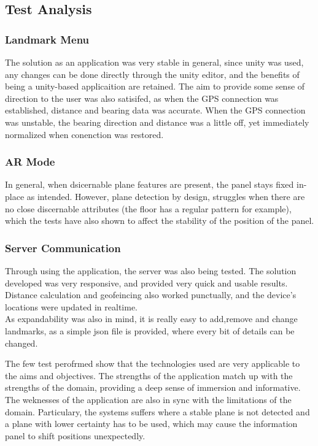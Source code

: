 \subsection{Test Analysis}
\subsubsection{Landmark Menu}
The solution as an application was very stable in general, since unity was used, any changes can be done directly through the unity editor, and the benefits of being a 
unity-based applicaition are retained. The aim to provide some sense of direction to the user was also satisifed, as when the GPS connection was established, distance 
and bearing data was accurate. When the GPS connection was unstable, the bearing direction and distance was a little off, yet immediately normalized when conenction was restored. 
\subsubsection{AR Mode}
In general, when dsicernable plane features are present, the panel stays fixed in-place as intended.
However, plane detection by design, struggles when there are no close discernable attributes (the floor has a regular pattern for example), which the tests 
have also shown to affect the stability of the position of the panel.
\subsubsection{Server Communication}
Through using the application, the server was also being tested. The solution developed was very responsive, and provided very quick and usable results. 
Distance calculation and geofeincing also worked punctually, and the device's locations were updated in realtime.\\
As expandability was also in mind, it is really easy to add,remove and change landmarks, as a simple json file is provided, where every bit of details can be changed.

The few test perofrmed show that the technologies used are very applicable to the aims and objectives. The strengths of the application match up with the strengths of the domain, 
providing a deep sense of immersion and informative. The weknesses of the application are also in sync with the limitations of the domain. Particulary, the systems suffers where a stable 
plane is not detected and a plane with lower certainty has to be used, which may cause the information panel to shift positions unexpectedly. 

